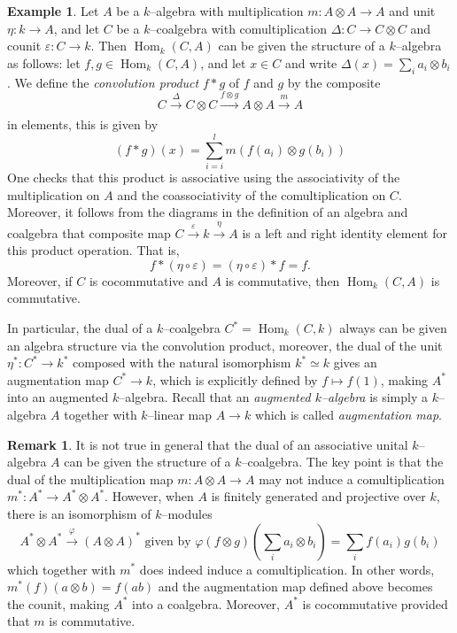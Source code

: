 \documentclass{article}
\theoremstyle{plain}
\theoremstyle{definition}
\newtheorem{Rem}[Th]{Remark}
\newtheorem{Ex}[Th]{Example}
\DeclareMathOperator{\Hom}{Hom}
\begin{document}
\begin{Ex}\label{dual of a coalgebra}
Let $A$ be a $k$--algebra with multiplication $m:A\otimes A\to A$ and unit $\eta: k\to A$, and let $C$ be a $k$--coalgebra with comultiplication $\Delta:C\to C\otimes C$ and counit $\varepsilon:C\to k$. Then $\Hom_k(C, A)$ can be given the structure of a $k$--algebra as follows: let $f, g\in \Hom_k(C, A)$, and let $x\in C$ and write $\Delta(x)=\sum_i a_{i}\otimes b_{i}$. We define the \textit{convolution product} $f\ast g$ of $f$ and $g$ by the composite
\[
C\xrightarrow[]{\Delta} C\otimes C \xrightarrow[]{f\otimes g} A\otimes A\xrightarrow[]{m} A
\]
in elements, this is given by  
\[
(f \ast g)(x)=\sum_{i=i}^l m(f(a_i)\otimes g(b_i))
\]
    One checks that this product is associative using the associativity of the multiplication on $A$ and the coassociativity of the comultiplication on $C$. Moreover, it follows from the diagrams in the definition of an algebra and coalgebra that composite map $C\xrightarrow{\varepsilon}{} k \xrightarrow{\eta}{}A$ is a left and right identity element for this product operation. That is, 
    \[
    f\ast (\eta\circ\varepsilon) = (\eta\circ\varepsilon) \ast f = f.
    \]
    Moreover, if $C$ is cocommutative and $A$ is commutative, then $\Hom_k(C,A)$ is commutative. 
    
    In particular, the dual of a  $k$--coalgebra $C^*=\Hom_k(C, k)$ always can be given an algebra structure via the convolution product, moreover, the dual of the unit $\eta^*:C^*\to k^*$ composed with the natural isomorphism $k^*\simeq k$ gives an augmentation map $C^* \to k$, which is explicitly defined by $f\mapsto f(1)$, making $A^\ast$ into an augmented $k$--algebra. Recall that an \textit{augmented $k$--algebra} is simply a $k$--algebra $A$ together with $k$--linear map $A\to k$ which is called \textit{augmentation map}.
\end{Ex}

    \begin{Rem}
    It is not true in general that the dual of an associative unital $k$--algebra $A$ can be given the structure of a $k$--coalgebra. The key point is that the dual of the multiplication map $m:A\otimes A\to A$ may not induce a comultiplication $m^*: A^*\to A^*\otimes A^*$. However,  when $A$ is finitely generated and projective over $k$,  there is an  isomorphism of $k$--modules
    \[
    A^*\otimes A^* \xrightarrow[]{\varphi} (A\otimes A)^* \mbox{ given by } \varphi(f\otimes g)(\sum_i a_i\otimes b_i)=\sum_i f(a_i)g(b_i)
    \]
       which together with $m^*$ does indeed induce a comultiplication. In other words, $m^*(f)(a\otimes b)=f(ab)$ and the augmentation map defined above becomes the counit, making $A^*$ into a coalgebra. Moreover, $A^\ast$ is cocommutative provided that $m$ is commutative. 
\end{Rem}
\end{document}
